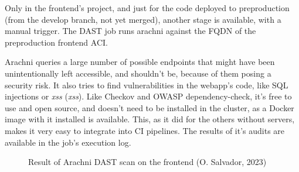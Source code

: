 \documentclass[11pt]{article}
\begin{document}
\begin{flushleft}
    Only in the frontend's project, and just for the code deployed to preproduction (from the develop branch, not yet merged), another stage is available, with a manual trigger. The DAST job runs arachni against the FQDN of the preproduction frontend ACI. 
    \linebreak

    Arachni queries a large number of possible endpoints that might have been unintentionally left accessible, and shouldn't be, because of them posing a security risk. It also tries to find vulnerabilities in the webapp's code, like SQL injections or \textit{\acrlong{xss}} (\textit{\acrshort{xss}}). Like Checkov and OWASP dependency-check, it's free to use and open source, and doesn't need to be installed in the cluster, as a Docker image with it installed is available. This, as it did for the others without servers, makes it very easy to integrate into CI pipelines. The results of it's audits are available in the job's execution log.
    \linebreak
    
        \begin{figure}[htb]
            \centering
            \caption{Result of Arachni DAST scan on the frontend (O. Salvador, 2023)}
        \end{figure}

























\end{flushleft}
\end{document}
